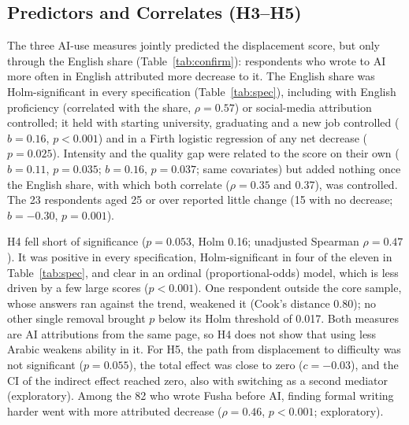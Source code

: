 \documentclass[conference]{IEEEtran}
\begin{document}
\subsection{Predictors and Correlates (H3--H5)}

The three AI-use measures jointly predicted the displacement score, but only through the English share (Table~\ref{tab:confirm}): respondents who wrote to AI more often in English attributed more decrease to it. The English share was Holm-significant in every specification (Table~\ref{tab:spec}), including with English proficiency (correlated with the share, $\rho=0.57$) or social-media attribution controlled; it held with starting university, graduating and a new job controlled ($b=0.16$, $p<0.001$) and in a Firth logistic regression of any net decrease ($p=0.025$). Intensity and the quality gap were related to the score on their own ($b=0.11$, $p=0.035$; $b=0.16$, $p=0.037$; same covariates) but added nothing once the English share, with which both correlate ($\rho=0.35$ and 0.37), was controlled. The 23 respondents aged 25 or over reported little change (15 with no decrease; $b=-0.30$, $p=0.001$).

H4 fell short of significance ($p=0.053$, Holm 0.16; unadjusted Spearman $\rho=0.47$). It was positive in every specification, Holm-significant in four of the eleven in Table~\ref{tab:spec}, and clear in an ordinal (proportional-odds) model, which is less driven by a few large scores ($p<0.001$). One respondent outside the core sample, whose answers ran against the trend, weakened it (Cook's distance 0.80); no other single removal brought $p$ below its Holm threshold of 0.017. Both measures are AI attributions from the same page, so H4 does not show that using less Arabic weakens ability in it. For H5, the path from displacement to difficulty was not significant ($p=0.055$), the total effect was close to zero ($c=-0.03$), and the CI of the indirect effect reached zero, also with switching as a second mediator (exploratory). Among the 82 who wrote Fusha before AI, finding formal writing harder went with more attributed decrease ($\rho=0.46$, $p<0.001$; exploratory).
\end{document}
